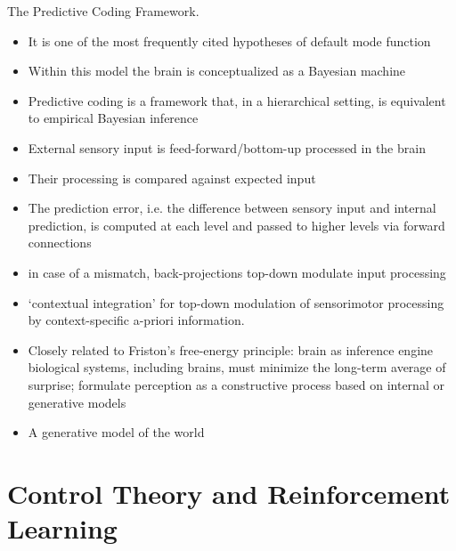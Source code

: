 \documentclass{article} %
\begin{document}
The Predictive Coding Framework.
\begin{itemize}
  \item It is one of the most frequently cited hypotheses of default mode function
  \item Within this model the brain is conceptualized as a Bayesian machine
  \item Predictive coding is a framework that, in a hierarchical setting,
  is equivalent to empirical Bayesian inference
  \item External sensory input is feed-forward/bottom-up processed in the brain
  \item Their processing is compared against expected input
  \item The prediction error, i.e. the difference between sensory input
  and internal prediction, is computed at each level and passed to
  higher levels via forward connections
  \item in case of a mismatch, back-projections top-down modulate
  input processing
  \item ‘contextual integration’ for top-down modulation of sensorimotor
  processing by context-specific a-priori information.
  \item Closely related to Friston's free-energy principle: brain as inference engine
  biological systems, including brains, must minimize the long-term average of surprise;
  formulate perception as a constructive process based on internal or generative models
  \item A generative model of the world
\end{itemize}


\section{Control Theory and Reinforcement Learning}
\end{document}
